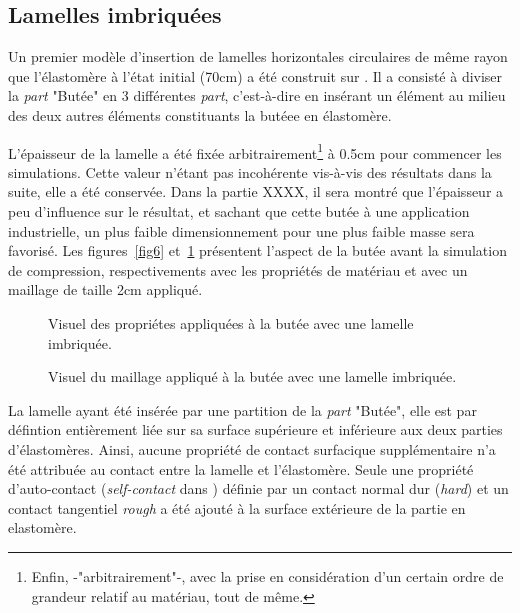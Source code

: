 ﻿\documentclass{article}
\newcommand{\abaqus}{\bsc{Abaqus}\xspace}
\begin{document}
\subsection{Lamelles imbriquées}

Un premier modèle d'insertion de lamelles horizontales circulaires de même rayon que l'élastomère à l'état initial (70cm) a été construit sur \abaqus. Il a consisté à diviser la \textit{part} "Butée" en 3 différentes \textit{part}, c'est-à-dire en insérant un élément au milieu des deux autres éléments constituants la butéee en élastomère.

L'épaisseur de la lamelle a été fixée arbitrairement\footnote{Enfin, -"arbitrairement"-, avec la prise en considération d'un certain ordre de grandeur relatif au matériau, tout de même.} à 0.5cm pour commencer les simulations. Cette valeur n'étant pas incohérente vis-à-vis des résultats dans la suite, elle a été conservée. Dans la partie XXXX, il sera montré que l'épaisseur a peu d'influence sur le résultat, et sachant que cette butée à une application industrielle, un plus faible dimensionnement pour une plus faible masse sera favorisé. 
Les figures~\ref{fig6} et~\ref{fig7} présentent l'aspect de la butée avant la simulation de compression, respectivements avec les propriétés de matériau et avec un maillage de taille 2cm appliqué.

\begin{figure}[htbp]
	\begin{minipage}[c]{.45\linewidth}
	\begin{center}
	\caption{Visuel des propriétes appliquées à la butée avec une lamelle imbriquée.}
	\label{fig6}
	\end{center}
	\end{minipage}
	\hfill
	\begin{minipage}[c]{.45\linewidth}
	\begin{center}
	\caption{Visuel du maillage appliqué à la butée avec une lamelle imbriquée.}
	\label{fig7}
	\end{center}
	\end{minipage}
\end{figure}

La lamelle ayant été insérée par une partition de la \textit{part} "Butée", elle est par défintion entièrement liée sur sa surface supérieure et inférieure aux deux parties d'élastomères. Ainsi, aucune propriété de contact surfacique supplémentaire n'a été attribuée au contact entre la lamelle et l'élastomère. Seule une propriété d'auto-contact (\textit{self-contact} dans \abaqus) définie par un contact normal dur (\textit{hard}) et un contact tangentiel \textit{rough} a été ajouté à la surface extérieure de la partie en elastomère. 
\end{document}
